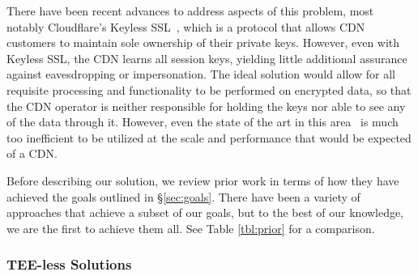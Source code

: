 


There have been recent advances to address aspects of this problem,
most notably Cloudflare's Keyless SSL~\cite{keyless-ssl}, which is a
protocol that allows CDN customers to maintain sole ownership of their
private keys.
%
However, even with Keyless SSL, the CDN learns all session keys,
yielding little additional assurance against eavesdropping or
impersonation.
%
The ideal solution would allow for all requisite processing and
functionality to be performed on encrypted data, so that the CDN
operator is neither responsible for holding the keys nor able to see
any of the data through it.
%
However, even the state of the art in this
area~\cite{naylor2015multi,naylor2017and,leematls,desmoulins2018pattern,
sherry2015blindbox, canard2017blindids,lan2016embark} is much too
inefficient to be utilized at the scale and performance that would be
expected of a CDN.

Before describing our solution, we review prior work in terms of how they have
achieved the goals outlined in \S\ref{sec:goals}.  There have been a variety of
approaches that achieve a subset of our goals, but to the best of our
knowledge, we are the first to achieve them all.  See Table \ref{tbl:prior} for
a comparison.

\subsubsection{TEE-less Solutions}

